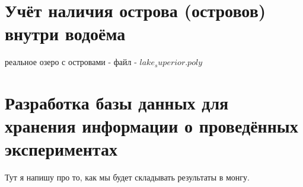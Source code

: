 \documentclass[14pt]{extreport}
\begin{document}
\chapter{Учёт наличия острова (островов) внутри водоёма}

реальное озеро с островами - файл - $lake_superior.poly$


\chapter{Разработка базы данных для хранения информации о проведённых экспериментах}

Тут я напишу про то, как мы будет складывать результаты в монгу.





\end{document}
